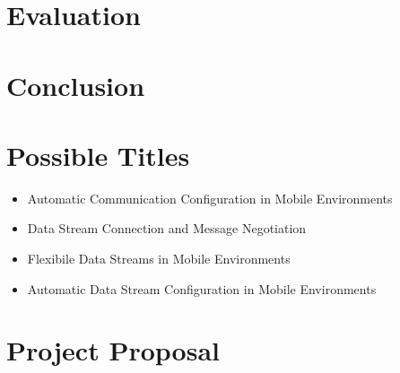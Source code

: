 \documentclass[12pt,twoside,notitlepage]{report}
\begin{document}
\cleardoublepage


\chapter{Evaluation}


\cleardoublepage


\chapter{Conclusion}


\cleardoublepage



\cleardoublepage

\appendix

\chapter{Possible Titles}

\begin{itemize}
\item Automatic Communication Configuration in Mobile Environments
\item Data Stream Connection and Message Negotiation
\item Flexibile Data Streams in Mobile Environments
\item Automatic Data Stream Configuration in Mobile Environments
\end{itemize}

\cleardoublepage

\chapter{Project Proposal}


\end{document}
